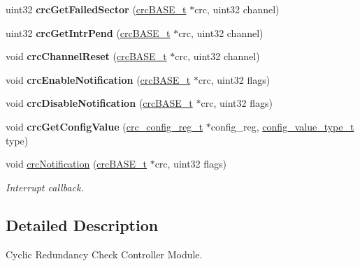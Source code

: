 \begin{DoxyCompactItemize}
uint32 {\bfseries crc\+Get\+Failed\+Sector} (\mbox{\hyperlink{reg__crc_8h_a5d27a33c6347de7aac595ad4daefb611}{crc\+B\+A\+S\+E\+\_\+t}} $\ast$crc, uint32 channel)
\item 
\mbox{\label{group__CRC_ga378dece388c957f4f93257dd060f62e3}} 
uint32 {\bfseries crc\+Get\+Intr\+Pend} (\mbox{\hyperlink{reg__crc_8h_a5d27a33c6347de7aac595ad4daefb611}{crc\+B\+A\+S\+E\+\_\+t}} $\ast$crc, uint32 channel)
\item 
\mbox{\label{group__CRC_ga43f0c3ac380bc6da46f2f12b7273a815}} 
void {\bfseries crc\+Channel\+Reset} (\mbox{\hyperlink{reg__crc_8h_a5d27a33c6347de7aac595ad4daefb611}{crc\+B\+A\+S\+E\+\_\+t}} $\ast$crc, uint32 channel)
\item 
\mbox{\label{group__CRC_ga555ea5923db608a43b1f682e63ea5072}} 
void {\bfseries crc\+Enable\+Notification} (\mbox{\hyperlink{reg__crc_8h_a5d27a33c6347de7aac595ad4daefb611}{crc\+B\+A\+S\+E\+\_\+t}} $\ast$crc, uint32 flags)
\item 
\mbox{\label{group__CRC_gadc56c4a4d2d5d8d2bea897bec4e4a424}} 
void {\bfseries crc\+Disable\+Notification} (\mbox{\hyperlink{reg__crc_8h_a5d27a33c6347de7aac595ad4daefb611}{crc\+B\+A\+S\+E\+\_\+t}} $\ast$crc, uint32 flags)
\item 
\mbox{\label{group__CRC_gab7f8e03a592d066d89b53ce3c474facc}} 
void {\bfseries crc\+Get\+Config\+Value} (\mbox{\hyperlink{structcrc__config__reg}{crc\+\_\+config\+\_\+reg\+\_\+t}} $\ast$config\+\_\+reg, \mbox{\hyperlink{sys__common_8h_a9daf9a5992391b058477d28d107ee5e2}{config\+\_\+value\+\_\+type\+\_\+t}} type)
\item 
void \mbox{\hyperlink{group__CRC_ga95b0b31099a6321977d0893c96ae5a9a}{crc\+Notification}} (\mbox{\hyperlink{reg__crc_8h_a5d27a33c6347de7aac595ad4daefb611}{crc\+B\+A\+S\+E\+\_\+t}} $\ast$crc, uint32 flags)
\begin{DoxyCompactList}\small\item\em Interrupt callback. \end{DoxyCompactList}\end{DoxyCompactItemize}


\subsection{Detailed Description}
Cyclic Redundancy Check Controller Module. 


